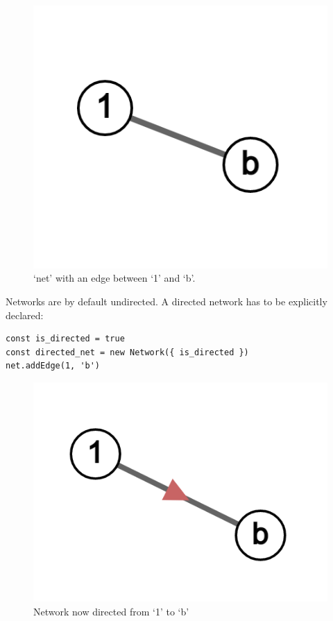 \begin{figure}[H]
  \includegraphics[width=\linewidth]{img/ex_net_1b.png}
  \caption{`net' with an edge between `1' and `b'.}
  \label{fig:net_1b}
\end{figure}

Networks are by default undirected.
A directed network has to be explicitly declared:

\begin{verbatim}
const is_directed = true
const directed_net = new Network({ is_directed })
net.addEdge(1, 'b')
\end{verbatim}

\begin{figure}[H]
  \includegraphics[width=\linewidth]{img/ex_net_1b_dir.png}
  \caption{Network now directed from `1' to `b'}
  \label{fig:net_1b_dir}
\end{figure}

